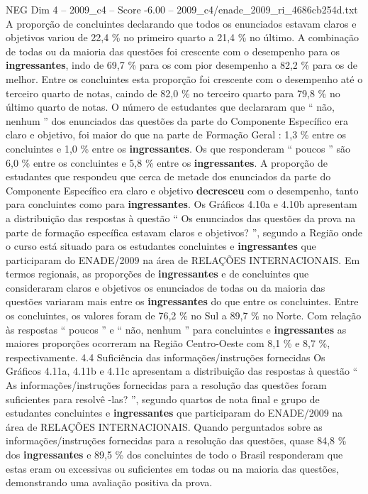 \begin{textsample}{NEG Dim 4 – 2009\_c4 – Score -6.00 – 2009\_c4/enade\_2009\_ri\_4686cb254d.txt}
A proporção de concluintes declarando que todos os enunciados estavam claros e objetivos variou de 22,4 \% no primeiro quarto a 21,4 \% no último.
A combinação de todas ou da maioria das questões foi crescente com o desempenho para os \textbf{ingressantes}, indo de 69,7 \% para os com pior desempenho a 82,2 \% para os de melhor.
Entre os concluintes esta proporção foi crescente com o desempenho até o terceiro quarto de notas, caindo de 82,0 \% no terceiro quarto para 79,8 \% no último quarto de notas.
O número de estudantes que declararam que “ não, nenhum ” dos enunciados das questões da parte do Componente Específico era claro e objetivo, foi maior do que na parte de Formação Geral : 1,3 \% entre os concluintes e 1,0 \% entre os \textbf{ingressantes}.
Os que responderam “ poucos ” são 6,0 \% entre os concluintes e 5,8 \% entre os \textbf{ingressantes}.
A proporção de estudantes que respondeu que cerca de metade dos enunciados da parte do Componente Específico era claro e objetivo \textbf{decresceu} com o desempenho, tanto para concluintes como para \textbf{ingressantes}.
Os Gráficos 4.10a e 4.10b apresentam a distribuição das respostas à questão “ Os enunciados das questões da prova na parte de formação específica estavam claros e objetivos? ”, segundo a Região onde o curso está situado para os estudantes concluintes e \textbf{ingressantes} que participaram do ENADE/2009 na área de RELAÇÕES INTERNACIONAIS.
Em termos regionais, as proporções de \textbf{ingressantes} e de concluintes que consideraram claros e objetivos os enunciados de todas ou da maioria das questões variaram mais entre os \textbf{ingressantes} do que entre os concluintes.
Entre os concluintes, os valores foram de 76,2 \% no Sul a 89,7 \% no Norte.
Com relação às respostas “ poucos ” e “ não, nenhum ” para concluintes e \textbf{ingressantes} as maiores proporções ocorreram na Região Centro-Oeste com 8,1 \% e 8,7 \%, respectivamente. 4.4 Suficiência das informações/instruções fornecidas Os Gráficos 4.11a, 4.11b e 4.11c apresentam a distribuição das respostas à questão “ As informações/instruções fornecidas para a resolução das questões foram suficientes para resolvê -las? ”, segundo quartos de nota final e grupo de estudantes concluintes e \textbf{ingressantes} que participaram do ENADE/2009 na área de RELAÇÕES INTERNACIONAIS.
Quando perguntados sobre as informações/instruções fornecidas para a resolução das questões, quase 84,8 \% dos \textbf{ingressantes} e 89,5 \% dos concluintes de todo o Brasil responderam que estas eram ou excessivas ou suficientes em todas ou na maioria das questões, demonstrando uma avaliação positiva da prova.

\end{textsample}
